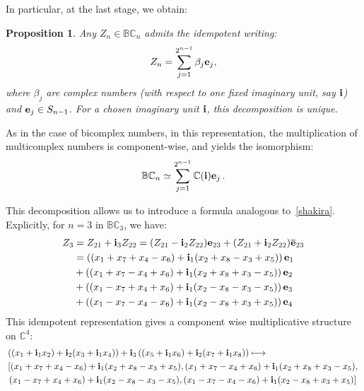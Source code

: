 \documentclass[reqno]{amsart}
\theoremstyle{plain}
\newtheorem{proposition}[theorem]{Proposition}
\theoremstyle{definition}
\theoremstyle{remark}
\numberwithin{equation}{section}
\begin{document}
\medskip

In particular, at the last stage, we obtain:
\begin{proposition}
  Any $Z_n\in{{\mathbb B}{\mathbb C}}_n$ admits the idempotent writing:
  \begin{align}
    \label{last_stage}
    Z_n=\sum_{j=1}^{2^{n-1}} \beta_j{{\bf e}}_j,
  \end{align}
  where $\beta_j$ are complex numbers (with respect to one fixed imaginary unit, say
  ${{\bf i}}$) and ${{\bf e}}_j\in S_{n-1}$. For a chosen imaginary unit ${{\bf i}}$, this decomposition is unique.
\end{proposition}
As in the case of bicomplex numbers, in this representation, the
multiplication of multicomplex numbers is component-wise, and yields
the isomorphism:
\begin{align*}
  {{\mathbb B}{\mathbb C}}_n \simeq \sum_{j=1}^{2^{n-1}} {{\mathbb C}}({{\bf i}}){{\bf e}}_j\,.
\end{align*}

\medskip

This decomposition allows us to introduce a formula analogous
to~\eqref{shakira}. Explicitly, for $n=3$ in ${{\mathbb B}{\mathbb C}}_3$, we have:
\begin{align}
  \label{shakiraDD}
  Z_3 &= Z_{21} + {{\bf i}}_3 Z_{22} = (Z_{21}-{{\bf i}}_2 Z_{22}){{\bf e}}_{23} + (Z_{21}+{{\bf i}}_2 Z_{22}){{\overline{{{\bf e}}}}}_{23}\nonumber\\
  &= \left((x_1+x_7+x_4-x_6)+ {{\bf i}}_1(x_2+x_8-x_3+x_5)\right){{\bf e}}_1 \nonumber\\
  &+ \left((x_1+x_7-x_4+x_6)+ {{\bf i}}_1(x_2+x_8+x_3-x_5)\right){{\bf e}}_2 \nonumber\\
  &+ \left((x_1-x_7+x_4+x_6)+ {{\bf i}}_1(x_2-x_8-x_3-x_5)\right){{\bf e}}_3 \nonumber\\
  &+ \left((x_1-x_7-x_4-x_6)+ {{\bf i}}_1(x_2-x_8+x_3+x_5)\right){{\bf e}}_4
\end{align}
This idempotent representation gives a component wise multiplicative
structure on ${{\mathbb C}}^4$:
\begin{align*}
  &\left((x_1 + {{\bf i}}_1 x_2) + {{\bf i}}_2(x_3 + {{\bf i}}_1 x_4)\right) +
  {{\bf i}}_3 \left((x_5 + {{\bf i}}_1 x_6) + {{\bf i}}_2(x_7 + {{\bf i}}_1 x_8)\right)\longmapsto\\
  &\left[(x_1+x_7+x_4-x_6)+ {{\bf i}}_1(x_2+x_8-x_3+x_5), (x_1+x_7-x_4+x_6)+ {{\bf i}}_1(x_2+x_8+x_3-x_5),\right.\\
  & \left.(x_1-x_7+x_4+x_6)+ {{\bf i}}_1(x_2-x_8-x_3-x_5),  (x_1-x_7-x_4-x_6)+ {{\bf i}}_1(x_2-x_8+x_3+x_5)\right]
\end{align*}
\end{document}
